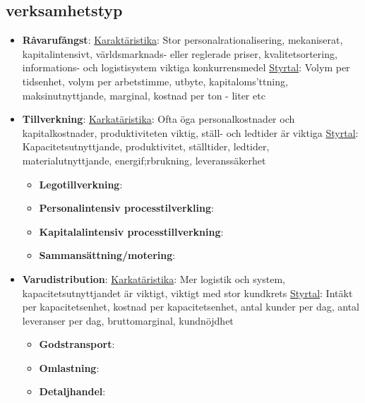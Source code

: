 \documentclass{article}
\begin{document}
\subsection{verksamhetstyp}
\begin{itemize}
    \item \textbf{Råvarufångst}: \newline
    \underline{Karaktäristika}: \newline
    Stor personalrationalisering, mekaniserat, kapitalintensivt, världsmarknads- eller reglerade priser, kvalitetsortering, informations- och logistisystem viktiga konkurrensmedel \newline
    \underline{Styrtal}: \newline
    Volym per tidsenhet, volym per arbetstimme, utbyte, kapitaloms'ttning, maksinutnyttjande, marginal, kostnad per ton - liter etc
    \item \textbf{Tillverkning}:
    \underline{Karkatäristika}: \newline
    Ofta öga personalkostnader och kapitalkostnader, produktiviteten viktig, ställ- och ledtider är viktiga \newline
    \underline{Styrtal}: \newline
    Kapacitetsutnyttjande, produktivitet, ställtider, ledtider, materialutnyttjande, energif;rbrukning, leveranssäkerhet
    \begin{itemize}
        \item \textbf{Legotillverkning}:
        \item \textbf{Personalintensiv processtilverkling}:
        \item \textbf{Kapitalalintensiv processtillverkning}:
        \item \textbf{Sammansättning/motering}:
    \end{itemize}
    \item \textbf{Varudistribution}:
    \underline{Karkatäristika}: \newline
    Mer logistik och system, kapacitetsutnyttjandet är viktigt, viktigt med stor kundkrets \newline
    \underline{Styrtal}: \newline
    Intäkt per kapacitetsenhet, kostnad per kapacitetsenhet, antal kunder per dag, antal leveranser per dag, bruttomarginal, kundnöjdhet
    \begin{itemize}
        \item \textbf{Godstransport}:
        \item \textbf{Omlastning}:
        \item \textbf{Detaljhandel}:

\end{itemize}
\end{itemize}
\end{document}
